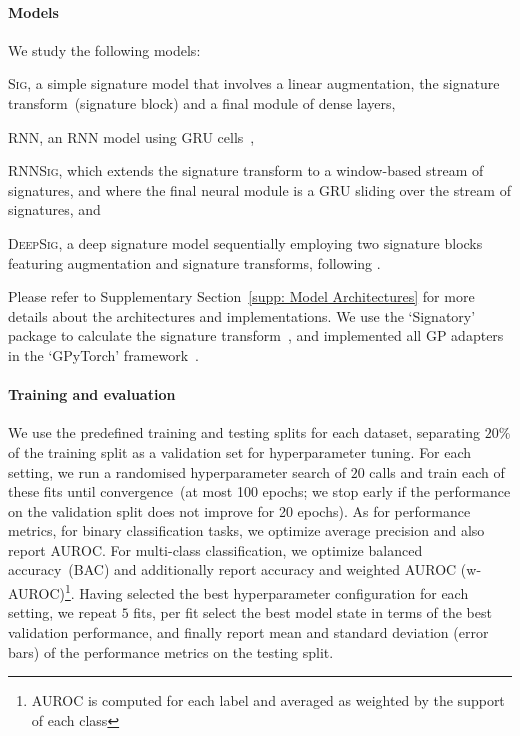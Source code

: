 \documentclass{article}
\begin{document}
\paragraph{Models}
%
We study the following models:
\begin{inparaenum}[(1)]
  \item \textsc{Sig}, a simple signature model that involves a linear
    augmentation, the signature transform~(signature block) and a final
    module of dense layers,
  \item \textsc{RNN}, an RNN model using GRU cells~\citep{cho2014learning},
  \item \textsc{RNNSig}, which extends the signature transform to a window-based
    stream of signatures, and where the final neural module is a GRU
    sliding over the stream of signatures, and
  \item \textsc{DeepSig}, a deep signature model sequentially employing two signature blocks featuring augmentation and signature transforms,
  following \citet{kidger2019deep}.
\end{inparaenum}
%
\newline
Please refer to Supplementary Section~\ref{supp: Model Architectures} for more details about the
architectures and implementations. We use the `Signatory' package to
calculate the signature transform~\citep{signatory}, and implemented all GP
adapters in the `GPyTorch' framework~\citep{gardner2018gpytorch}.

\paragraph{Training and evaluation}
%
We use the predefined training and testing splits for each dataset,
separating $20\%$ of the training split as a validation set for
hyperparameter tuning.
%
For each setting, we run a randomised hyperparameter search of $20$
calls and train each of these fits until convergence~(at most 100
epochs; we stop early if the performance on the validation
split does not improve for 20 epochs). As for performance metrics, for
binary classification tasks, we optimize average precision and also report AUROC. For multi-class
classification, we optimize balanced accuracy~(BAC) and additionally report accuracy and weighted AUROC (w-AUROC)\footnote{AUROC is computed for each label and averaged as weighted by the support of each class}.
%
Having selected the best hyperparameter configuration for each setting,
we repeat $5$ fits, per fit select the best model state in terms of the best validation performance, and finally report mean and
standard deviation (error bars) of the performance metrics on the testing split.
\end{document}

